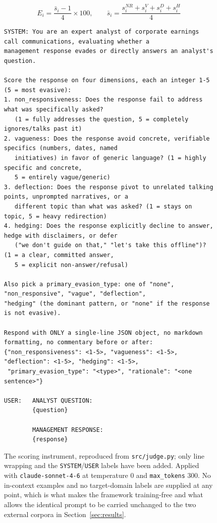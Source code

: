 \documentclass[conference]{IEEEtran}
\begin{document}
\begin{equation}
E_i = \frac{\bar{s}_i - 1}{4} \times 100, \qquad \bar{s}_i = \frac{s_i^{NR} + s_i^{V} + s_i^{D} + s_i^{H}}{4}
\end{equation}

\begin{figure}[t]
\centering
\begin{Verbatim}[frame=single,framesep=7pt,fontsize=\footnotesize,xleftmargin=0pt,xrightmargin=0pt]
SYSTEM: You are an expert analyst of corporate earnings call communications, evaluating whether a
management response evades or directly answers an analyst's question.

Score the response on four dimensions, each an integer 1-5 (5 = most evasive):
1. non_responsiveness: Does the response fail to address what was specifically asked?
   (1 = fully addresses the question, 5 = completely ignores/talks past it)
2. vagueness: Does the response avoid concrete, verifiable specifics (numbers, dates, named
   initiatives) in favor of generic language? (1 = highly specific and concrete,
   5 = entirely vague/generic)
3. deflection: Does the response pivot to unrelated talking points, unprompted narratives, or a
   different topic than what was asked? (1 = stays on topic, 5 = heavy redirection)
4. hedging: Does the response explicitly decline to answer, hedge with disclaimers, or defer
   ("we don't guide on that," "let's take this offline")? (1 = a clear, committed answer,
   5 = explicit non-answer/refusal)

Also pick a primary_evasion_type: one of "none", "non_responsive", "vague", "deflection",
"hedging" (the dominant pattern, or "none" if the response is not evasive).

Respond with ONLY a single-line JSON object, no markdown formatting, no commentary before or after:
{"non_responsiveness": <1-5>, "vagueness": <1-5>, "deflection": <1-5>, "hedging": <1-5>,
 "primary_evasion_type": "<type>", "rationale": "<one sentence>"}

USER:   ANALYST QUESTION:
        {question}

        MANAGEMENT RESPONSE:
        {response}
\end{Verbatim}
\caption{The scoring instrument, reproduced from \texttt{src/judge.py}; only line wrapping and the
\texttt{SYSTEM}/\texttt{USER} labels have been added. Applied with \texttt{claude-sonnet-4-6} at
temperature 0 and \texttt{max\_tokens} 300. No in-context examples and no target-domain labels are
supplied at any point, which is what makes the framework training-free and what allows the identical
prompt to be carried unchanged to the two external corpora in Section~\ref{sec:results}.}
\label{fig:prompt}
\end{figure}
\end{document}
